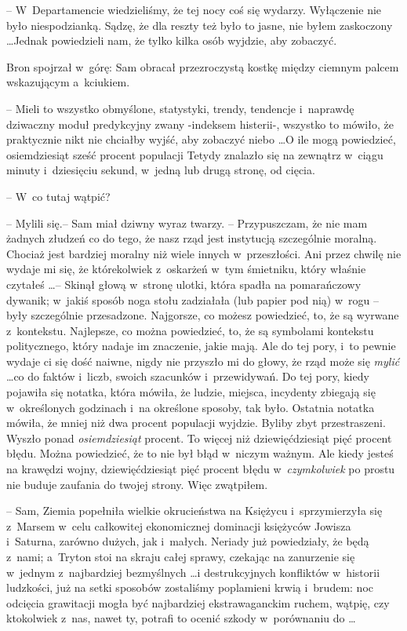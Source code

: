 \documentclass[oneside,polish,11pt,rmheadings]{mwbk}
\begin{document}
-- W~Departamencie wiedzieliśmy, że tej nocy coś się wydarzy. Wyłączenie nie było niespodzianką. Sądzę, że dla reszty też było to jasne, nie byłem zaskoczony \ldots   Jednak powiedzieli nam, że tylko kilka osób wyjdzie, aby zobaczyć. 

Bron spojrzał w~górę: Sam obracał przezroczystą kostkę między ciemnym palcem wskazującym a~kciukiem. 

-- Mieli to wszystko obmyślone, statystyki, trendy, tendencje i~naprawdę dziwaczny moduł predykcyjny zwany -indeksem histerii-, wszystko to mówiło, że praktycznie nikt nie chciałby wyjść, aby zobaczyć niebo \ldots   O ile mogą powiedzieć, osiemdziesiąt sześć procent populacji Tetydy znalazło się na zewnątrz w~ciągu minuty i~dziesięciu sekund, w~jedną lub drugą stronę, od cięcia. 

-- W~co tutaj wątpić? 

-- Mylili się.-- Sam miał dziwny wyraz twarzy. -- Przypuszczam, że nie mam żadnych złudzeń co do tego, że nasz rząd jest instytucją szczególnie moralną. Chociaż jest bardziej moralny niż wiele innych w~przeszłości. Ani przez chwilę nie wydaje mi się, że którekolwiek z~oskarżeń w~tym śmietniku, który właśnie czytałeś \ldots  -- Skinął głową w~stronę ulotki, która spadła na pomarańczowy dywanik; w~jakiś sposób noga stołu zadziałała (lub papier pod nią) w~rogu -- były szczególnie przesadzone. Najgorsze, co możesz powiedzieć, to, że są wyrwane z~kontekstu. Najlepsze, co można powiedzieć, to, że są symbolami kontekstu politycznego, który nadaje im znaczenie, jakie mają. Ale do tej pory, i~to pewnie wydaje ci się dość naiwne, nigdy nie przyszło mi do głowy, że rząd może się \textit{mylić } \ldots   co do faktów i~liczb, swoich szacunków i~przewidywań. Do tej pory, kiedy pojawiła się notatka, która mówiła, że ludzie, miejsca, incydenty zbiegają się w~określonych godzinach i~na określone sposoby, tak było. Ostatnia notatka mówiła, że mniej niż dwa procent populacji wyjdzie. Byliby zbyt przestraszeni. Wyszło ponad \textit{osiemdziesiąt } procent. To więcej niż dziewięćdziesiąt pięć procent błędu. Można powiedzieć, że to nie był błąd w~niczym ważnym. Ale kiedy jesteś na krawędzi wojny, dziewięćdziesiąt pięć procent błędu w~\textit{czymkolwiek } po prostu nie buduje zaufania do twojej strony. Więc zwątpiłem. 

-- Sam, Ziemia popełniła wielkie okrucieństwa na Księżycu i~sprzymierzyła się z~Marsem w~celu całkowitej ekonomicznej dominacji księżyców Jowisza i~Saturna, zarówno dużych, jak i~małych. Neriady już powiedziały, że będą z~nami; a~Tryton stoi na skraju całej sprawy, czekając na zanurzenie się w~jednym z~najbardziej bezmyślnych \ldots  i destrukcyjnych konfliktów w~historii ludzkości, już na setki sposobów zostaliśmy poplamieni krwią i~brudem: noc odcięcia grawitacji mogła być najbardziej ekstrawaganckim ruchem, wątpię, czy ktokolwiek z~nas, nawet ty, potrafi to ocenić szkody w~porównaniu do \ldots  
\end{document}
